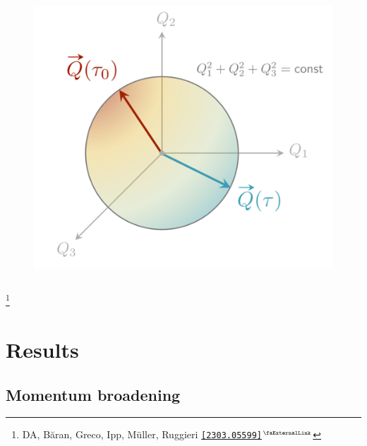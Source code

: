 \documentclass[aspectratio=169,11pt,usenames,dvipsnames]{beamer}
\renewcommand{\thefootnote}{\color{customblue}\faPaperPlaneO}
\newcommand\blfootnote[1]{%
  \begingroup
  \renewcommand\thefootnote{}\footnote{#1}%
  \addtocounter{footnote}{-1}%
  \endgroup
}
\begin{document}
\begin{frame}
\begin{columns}[onlytextwidth,t]
\begin{figure}[!hbt]
                \includegraphics[width=1.05\columnwidth]{images/wong_charge.png}
            \end{figure}
    \end{columns}

    \blfootnote{\scriptsize DA, Băran, Greco, Ipp, Müller, Ruggieri  \href{https://arxiv.org/abs/2303.05599}{{\color{palgold}\texttt{[2303.05599]}$^\text{\scalebox{0.9}{\faExternalLink}}$}}}
\end{frame}




\section{Results}


\subsection{Momentum broadening}

\end{document}
